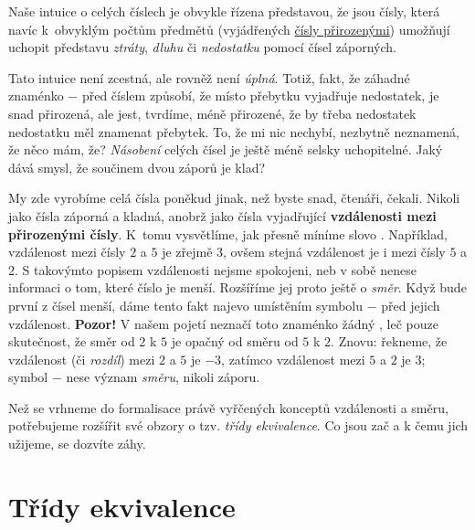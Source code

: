 Naše intuice o celých číslech je obvykle řízena představou, že jsou čísly,
která navíc k~obvyklým počtům předmětů (vyjádřených
\hyperref[chap:prirozena-cisla]{čísly přirozenými}) umožňují uchopit představu
\emph{ztráty}, \emph{dluhu} či \emph{nedostatku} pomocí čísel záporných.

Tato intuice není zcestná, ale rovněž není \emph{úplná}. Totiž, fakt, že záhadné
znaménko $-$ před číslem způsobí, že místo přebytku vyjadřuje nedostatek, je
snad přirozená, ale jest, tvrdíme, méně přirozené, že by třeba nedostatek
nedostatku měl znamenat přebytek. To, že mi nic nechybí, nezbytně neznamená, že
něco mám, že? \emph{Násobení} celých čísel je ještě méně selsky uchopitelné.
Jaký dává smysl, že součinem dvou záporů je klad?

My zde vyrobíme celá čísla poněkud jinak, než byste snad, čtenáři, čekali.
Nikoli jako čísla záporná a kladná, anobrž jako čísla vyjadřující
\textbf{vzdálenosti mezi přirozenými čísly}. K~tomu vysvětlíme, jak přesně
míníme slovo . Například, vzdálenost mezi čísly $2$ a $5$ je
zřejmě $3$, ovšem stejná vzdálenost je i mezi čísly $5$ a $2$. S takovýmto
popisem vzdálenosti nejsme spokojeni, neb v sobě nenese informaci o tom, které
číslo je menší. Rozšíříme jej proto ještě o \emph{směr}. Když bude první z čísel
menší, dáme tento fakt najevo umístěním symbolu $-$ před jejich vzdálenost.
\textbf{Pozor!} V našem pojetí neznačí toto znaménko žádný , leč pouze
skutečnost, že směr od $2$ k $5$ je opačný od směru od $5$ k $2$. Znovu:
řekneme, že vzdálenost (či \emph{rozdíl}) mezi $2$ a $5$ je $-3$, zatímco
vzdálenost mezi $5$ a $2$ je $3$; symbol $-$ nese význam \emph{směru}, nikoli
záporu.

Než se vrhneme do formalisace právě vyřčených konceptů vzdálenosti a směru,
potřebujeme rozšířit své obzory o tzv. \emph{třídy ekvivalence}. Co jsou zač a k
čemu jich užijeme, se dozvíte záhy.

\section{Třídy ekvivalence}
\label{sec:tridy-ekvivalence}


